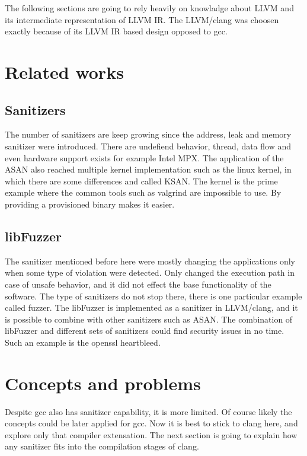\documentclass[letterpaper, 10 pt]{llncs}
\let\cite\parencite
\begin{document}
The following sections are going to rely heavily on knowladge about LLVM\cite{lattner2008llvm} and its intermediate representation of LLVM IR\cite{llvm-ir}. The LLVM/clang was choosen exactly because of its LLVM IR based design opposed to gcc.

\section{Related works}

\subsection{Sanitizers}
The number of sanitizers are keep growing since the address\cite{serebryany2012addresssanitizer}, leak and memory\cite{stepanov2013memorysanitizer} sanitizer were introduced. There are undefiend behavior, thread, data flow and even hardware support exists for example Intel MPX\cite{oleksenko2018intel}. The application of the ASAN also reached multiple kernel implementation such as the linux kernel, in which there are some differences and called KSAN\cite{reshetova2018toward}. The kernel is the prime example where the common tools such as valgrind are impossible to use. By providing a provisioned binary makes it easier.

\subsection{libFuzzer}
The sanitizer mentioned before here were mostly changing the applications only when some type of violation were detected. Only changed the execution path in case of unsafe behavior, and it did not effect the base functionality of the software. The type of sanitizers do not stop there, there is one particular example called fuzzer. The libFuzzer is implemented as a sanitizer in LLVM/clang, and it is possible to combine with other sanitizers such as ASAN. The combination of libFuzzer and different sets of sanitizers could find security issues in no time. Such an example is the openssl heartbleed\cite{alkazimi2016heartbleed}\cite{bohme2017directed}.

\section{Concepts and problems}

Despite gcc also has sanitizer capability, it is more limited\cite{hytonen2018replacing}. Of course likely the concepts could be later applied for gcc. Now it is best to stick to clang here, and explore only that compiler extensation. The next section is going to explain how any sanitizer fits into the compilation stages of clang.
\end{document}
